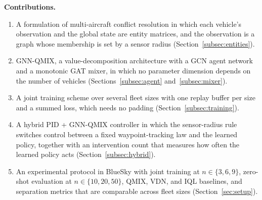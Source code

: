 \textbf{Contributions.}
\begin{enumerate}
\item A formulation of multi-aircraft conflict resolution in which each vehicle's
      observation and the global state are entity matrices, and the observation is a graph
      whose membership is set by a sensor radius (Section~\ref{subsec:entities}).
\item GNN-QMIX, a value-decomposition architecture with a GCN agent network and a monotonic
      GAT mixer, in which no parameter dimension depends on the number of vehicles
      (Sections~\ref{subsec:agent} and~\ref{subsec:mixer}).
\item A joint training scheme over several fleet sizes with one replay buffer per size and
      a summed loss, which needs no padding (Section~\ref{subsec:training}).
\item A hybrid PID + GNN-QMIX controller in which the sensor-radius rule switches control
      between a fixed waypoint-tracking law and the learned policy, together with an
      intervention count that measures how often the learned policy acts
      (Section~\ref{subsec:hybrid}).
\item An experimental protocol in BlueSky with joint training at $n\in\{3,6,9\}$, zero-shot
      evaluation at $n\in\{10,20,50\}$, QMIX, VDN, and IQL baselines, and separation metrics
      that are comparable across fleet sizes (Section~\ref{sec:setup}).
\end{enumerate}
